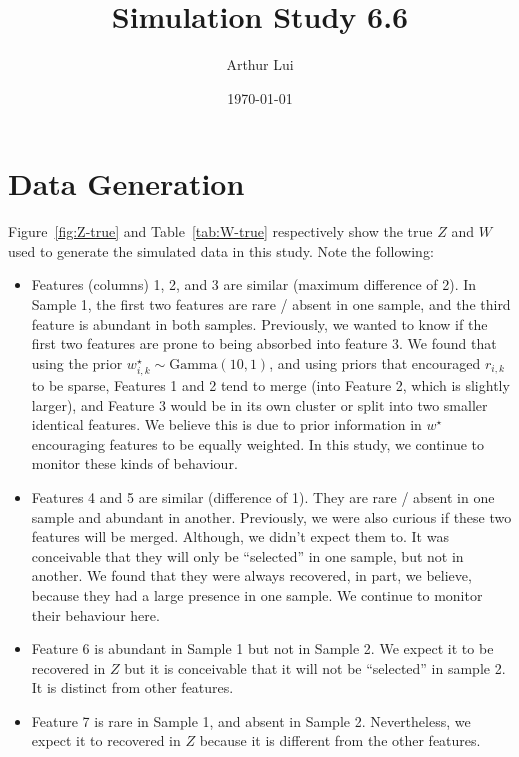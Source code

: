\documentclass[10pt]{article} %
\title{Simulation Study 6.6}
\author{Arthur Lui}
\date{\today} %
\newcommand{\Gam}{ \text{Gamma} }
\begin{document}
\maketitle



\section{Data Generation}\label{sec:data-generation}
Figure~\ref{fig:Z-true} and Table~\ref{tab:W-true} respectively show the true
$Z$ and $W$ used to generate the simulated data in this study. Note the following:
\begin{itemize}
  \item Features (columns) 1, 2, and 3 are similar (maximum difference of 2).
    In Sample 1, the first two features are rare / absent in one sample, and
    the third feature is abundant in both samples. Previously, we wanted to
    know if the first two features are prone to being absorbed into feature 3. We
    found that using the prior $w^\star_{i,k} \sim \Gam(10, 1)$, and using priors
    that encouraged $r_{i,k}$ to be sparse, Features 1 and 2 tend to merge
    (into Feature 2, which is slightly larger), and Feature 3 would be in its
    own cluster or split into two smaller identical features. We believe this is 
    due to prior information in $w^\star$ encouraging features to be equally weighted.
    In this study, we continue to monitor these kinds of behaviour.
  \item Features 4 and 5 are similar (difference of 1). They are rare / absent
    in one sample and abundant in another. Previously, we were also curious if
    these two features will be merged. Although, we didn't expect them to. It was
    conceivable that they will only be ``selected'' in one sample, but not in
    another. We found that they were always recovered, in part, we believe, because
    they had a large presence in one sample. We continue to monitor their behaviour
    here.
  \item Feature 6 is abundant in Sample 1 but not in Sample 2. We expect it to be
    recovered in $Z$ but it is conceivable that it will not be ``selected'' in sample
    2. It is distinct from other features.
  \item Feature 7 is rare in Sample 1, and absent in Sample 2. Nevertheless, we
    expect it to recovered in $Z$ because it is different from the other
    features.
\end{itemize}
\end{document}

